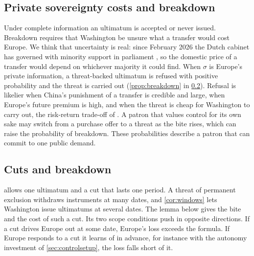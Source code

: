 \subsection{Private sovereignty costs and breakdown}\label{sec:breakdown}

Under complete information an ultimatum is accepted or never issued. Breakdown requires that Washington be unsure what a transfer would cost Europe. We think that uncertainty is real: since February 2026 the Dutch cabinet has governed with minority support in parliament \citep{nltimes2026coalition, omroepbrabant2026kabinet}, so the domestic price of a transfer would depend on whichever majority it could find. When $\sigma$ is Europe's private information, a threat-backed ultimatum is refused with positive probability and the threat is carried out (\cref{prop:breakdown} in \cref{app:cuts}). Refusal is likelier when China's punishment of a transfer is credible and large, when Europe's future premium is high, and when the threat is cheap for Washington to carry out, the risk-return trade-off of \citet{fearon1995rationalist}. A patron that values control for its own sake may switch from a purchase offer to a threat as the bite rises, which can raise the probability of breakdown. These probabilities describe a patron that can commit to one public demand.

\subsection{Cuts and breakdown}\label{app:cuts}

 allows one ultimatum and a cut that lasts one period. A threat of permanent exclusion withdraws instruments at many dates, and \cref{cor:windows} lets Washington issue ultimatums at several dates. The lemma below gives the bite and the cost of such a cut. Its two scope conditions push in opposite directions. If a cut drives Europe out at some date, Europe's loss exceeds the formula. If Europe responds to a cut it learns of in advance, for instance with the autonomy investment of \cref{sec:controlsetup}, the loss falls short of it.

